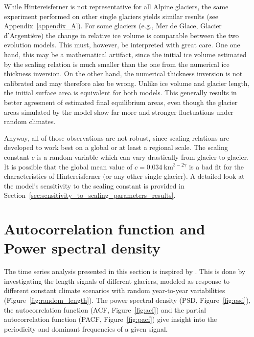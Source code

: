        While Hintereisferner is not representative for all Alpine glaciers, the same experiment performed on other single glaciers yields similar results (see Appendix~\ref{appendix_A}). For some glaciers (e.g., Mer de Glace, Glacier d'Argentière) the change in relative ice volume is comparable between the two evolution models. This must, however, be interpreted with great care. One one hand, this may be a mathematical artifact, since the initial ice volume estimated by the scaling relation is much smaller than the one from the numerical ice thickness inversion. On the other hand, the numerical thickness inversion is not calibrated and may therefore also be wrong. Unlike ice volume and glacier length, the initial surface area is equivalent for both models. This generally results in better agreement of estimated final equilibrium areas, even though the glacier areas simulated by the \vas{} model show far more and stronger fluctuations under random climates.

        Anyway, all of those observations are not robust, since scaling relations are developed to work best on a global or at least a regional scale. The scaling constant $c$ is a random variable which can vary drastically from glacier to glacier. It is possible that the global mean value of $c=\SI{0.034}{\kilo\meter^{3-2\gamma}}$ is a bad fit for the characteristics of Hintereisferner (or any other single glacier). A detailed look at the model's sensitivity to the scaling constant is provided in Section~\ref{sec:sensitivity_to_scaling_parameters_results}.




  \section{Autocorrelation function and Power spectral density} %
  \label{sec:autocorrelation_and_power_spectral_density_results}
        The time series analysis presented in this section is inspired by \citet{Roe2014}. This is done by investigating the length signals of different  glaciers, modeled as response to different constant climate scenarios with random year-to-year variabilities (Figure~\ref{fig:random_length}). The power spectral density (PSD, Figure~\ref{fig:psd}), the autocorrelation function (ACF, Figure~\ref{fig:acf}) and the partial autocorrelation function (PACF, Figure~\ref{fig:pacf}) give insight into the periodicity and dominant frequencies of a given signal.

